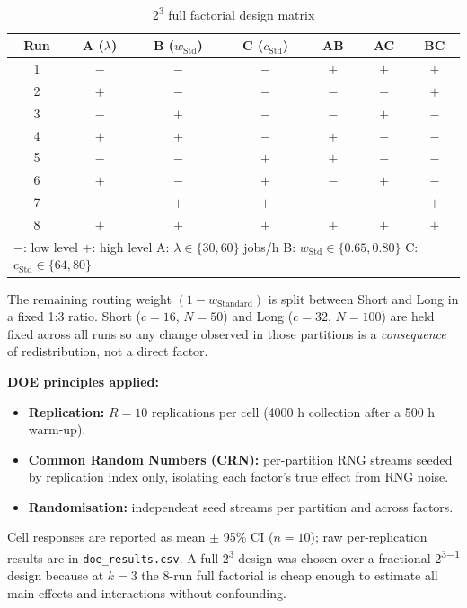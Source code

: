\documentclass[11pt,a4paper]{article}
\newcommand{\lam}{\ensuremath{\lambda}}
\begin{document}
\begin{table}[H]
\centering
\caption{2\textsuperscript{3} full factorial design matrix}
\begin{tabular}{ccccccc}
\toprule
\textbf{Run} &
\textbf{A} ($\lam$) &
\textbf{B} ($w_\text{Std}$) &
\textbf{C} ($c_\text{Std}$) &
\textbf{AB} &
\textbf{AC} &
\textbf{BC} \\
\midrule
1 & $-$ & $-$ & $-$ & $+$ & $+$ & $+$ \\
2 & $+$ & $-$ & $-$ & $-$ & $-$ & $+$ \\
3 & $-$ & $+$ & $-$ & $-$ & $+$ & $-$ \\
4 & $+$ & $+$ & $-$ & $+$ & $-$ & $-$ \\
5 & $-$ & $-$ & $+$ & $+$ & $-$ & $-$ \\
6 & $+$ & $-$ & $+$ & $-$ & $+$ & $-$ \\
7 & $-$ & $+$ & $+$ & $-$ & $-$ & $+$ \\
8 & $+$ & $+$ & $+$ & $+$ & $+$ & $+$ \\
\midrule
\multicolumn{7}{l}{$-$: low level \quad $+$: high level \quad
A: $\lam \in \{30, 60\}$ jobs/h \quad
B: $w_\text{Std} \in \{0.65, 0.80\}$ \quad
C: $c_\text{Std} \in \{64, 80\}$} \\
\bottomrule
\end{tabular}
\end{table}

The remaining routing weight $(1 - w_\text{Standard})$ is split between Short and Long in a fixed 1:3
ratio. Short ($c=16$, $N=50$) and Long ($c=32$, $N=100$) are held fixed across all runs so any change
observed in those partitions is a \emph{consequence} of redistribution, not a direct factor.

\textbf{DOE principles applied:}
\begin{itemize}
  \item \textbf{Replication:} $R=10$ replications per cell (4000 h collection after a 500 h warm-up).
  \item \textbf{Common Random Numbers (CRN):} per-partition RNG streams seeded by replication index only,
  isolating each factor's true effect from RNG noise.
  \item \textbf{Randomisation:} independent seed streams per partition and across factors.
\end{itemize}

Cell responses are reported as mean $\pm$ 95\% CI ($n=10$); raw per-replication results are in
\texttt{doe\_results.csv}. A full 2\textsuperscript{3} design was chosen over a fractional
2\textsuperscript{3$-$1} design because at $k=3$ the 8-run full factorial is cheap enough to estimate
all main effects and interactions without confounding.
\end{document}
